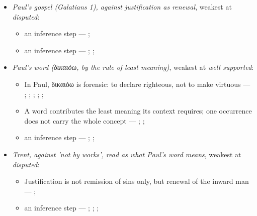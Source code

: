 \documentclass[11pt]{article}
\begin{document}
\begin{itemize}
\begin{itemize}
\item an inference step --- \cite{gathercole-where-boasting-2002}; \cite{carson-variegated-nomism-1-2001}
\end{itemize}
\item \emph{Paul's gospel (Galatians 1), against justification as renewal}, weakest at \emph{disputed}:
\begin{itemize}
\item an inference step --- \cite[ad loc. Gal 1:6]{moo-galatians-2013}; \cite[XI.1]{westminster-confession-1647}
\item an inference step --- \cite[XI.1]{westminster-confession-1647}; \cite[III.xi.2]{calvin-institutes-1960}; \cite{morris-apostolic-preaching-1965}
\end{itemize}
\item \emph{Paul's word (δικαιόω, by the rule of least meaning)}, weakest at \emph{well supported}:
\begin{itemize}
\item In Paul, δικαιόω is forensic: to declare righteous, not to make virtuous --- \cite[s.v. δικαιόω]{bauer-danker-lexicon-2000}; \cite{morris-apostolic-preaching-1965}; \cite[p. 80]{moo-romans-1996}; \cite{irons-righteousness-of-god-2015}; \cite{wright-justification-2009}; \cite[ad loc. Rom 3:24]{fitzmyer-romans-1993}
\item A word contributes the least meaning its context requires; one occurrence does not carry the whole concept --- \cite{silva-biblical-words-1994}; \cite{joos-semantic-axiom-1972}; \cite{barr-semantics-2004}
\item an inference step --- \cite{silva-biblical-words-1994}; \cite[p. 80]{moo-romans-1996}; \cite{barr-semantics-2004}
\end{itemize}
\item \emph{Trent, against 'not by works', read as what Paul's word means}, weakest at \emph{disputed}:
\begin{itemize}
\item Justification is not remission of sins only, but renewal of the inward man --- \cite[Trent, Session VI (1547), Decree on Justification, ch. 7]{tanner-decrees-1990}; \cite[Trent, Session VI (1547), canon 11]{tanner-decrees-1990}
\item an inference step --- \cite[Trent, Session VI (1547), Decree on Justification, ch. 8]{tanner-decrees-1990}; \cite[Trent, Session VI (1547), Decree on Justification, ch. 7]{tanner-decrees-1990}; \cite[On the Spirit and the Letter, ch. 45 (26.45)]{npnf1-05-1887}; \cite{mcgrath-iustitia-dei-2005}

\end{itemize}
\end{itemize}
\end{document}

